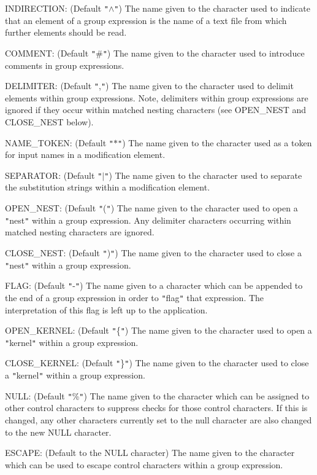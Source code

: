 {{{         \sstitem
         INDIRECTION: (Default {\tt "}$\wedge${\tt "}) The name given to the character used
         to indicate that an element of a group expression is the name of a
         text file from which further elements should be read.

         \sstitem
         COMMENT: (Default {\tt "}\#{\tt "}) The name given to the character used to
         introduce comments in group expressions.

         \sstitem
         DELIMITER: (Default {\tt "},{\tt "}) The name given to the character used
         to delimit elements within group expressions. Note, delimiters
         within group expressions are ignored if they occur within matched
         nesting characters (see OPEN\_NEST and CLOSE\_NEST below).

         \sstitem
         NAME\_TOKEN: (Default {\tt "}$*${\tt "}) The name given to the character used
         as a token for input names in a modification element.

         \sstitem
         SEPARATOR: (Default {\tt "}$|${\tt "}) The name given to the character used
         to separate the substitution strings within a modification
         element.

         \sstitem
         OPEN\_NEST: (Default {\tt "}({\tt "}) The name given to the character used
         to open a {\tt "}nest{\tt "} within a group expression. Any delimiter
         characters occurring within matched nesting characters are ignored.

         \sstitem
         CLOSE\_NEST: (Default {\tt "}){\tt "}) The name given to the character used
         to close a {\tt "}nest{\tt "} within a group expression.

         \sstitem
         FLAG: (Default {\tt "}-{\tt "}) The name given to a character which can
         be appended to the end of a group expression in order to
         {\tt "}flag{\tt "} that expression. The interpretation of this flag is left
         up to the application.

         \sstitem
         OPEN\_KERNEL: (Default {\tt "}\{{\tt "}) The name given to the character used
         to open a {\tt "}kernel{\tt "} within a group expression.

         \sstitem
         CLOSE\_KERNEL: (Default {\tt "}\}{\tt "}) The name given to the character used
         to close a {\tt "}kernel{\tt "} within a group expression.

         \sstitem
         NULL: (Default {\tt "}\%{\tt "}) The name given to the character which can
         be assigned to other control characters to suppress checks for
         those control characters.  If this is changed, any other characters
         currently set to the null character are also changed to the new NULL
         character.

         \sstitem
         ESCAPE: (Default to the NULL character) The name given to the 
         character which can be used to escape control characters within 
         a group expression.
      }
   }
}
